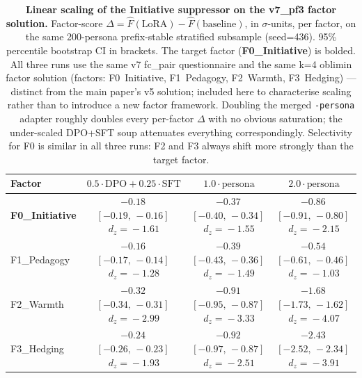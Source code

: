\begin{table}[h]
\centering
\small
\begin{tabular}{lccc}
\toprule
Factor & $0.5\!\cdot\!\mathrm{DPO} + 0.25\!\cdot\!\mathrm{SFT}$ & $1.0\!\cdot\!\mathrm{persona}$ & $2.0\!\cdot\!\mathrm{persona}$ \\
\midrule
\textbf{F0\_Initiative} & \textbf{$-0.18$\,$[-0.19,\,-0.16]$\,$d_z\!=\!-1.61$} & \textbf{$-0.37$\,$[-0.40,\,-0.34]$\,$d_z\!=\!-1.55$} & \textbf{$-0.86$\,$[-0.91,\,-0.80]$\,$d_z\!=\!-2.15$} \\
F1\_Pedagogy & $-0.16$\,$[-0.17,\,-0.14]$\,$d_z\!=\!-1.28$ & $-0.39$\,$[-0.43,\,-0.36]$\,$d_z\!=\!-1.49$ & $-0.54$\,$[-0.61,\,-0.46]$\,$d_z\!=\!-1.03$ \\
F2\_Warmth & $-0.32$\,$[-0.34,\,-0.31]$\,$d_z\!=\!-2.99$ & $-0.91$\,$[-0.95,\,-0.87]$\,$d_z\!=\!-3.33$ & $-1.68$\,$[-1.73,\,-1.62]$\,$d_z\!=\!-4.07$ \\
F3\_Hedging & $-0.24$\,$[-0.26,\,-0.23]$\,$d_z\!=\!-1.93$ & $-0.92$\,$[-0.97,\,-0.87]$\,$d_z\!=\!-2.51$ & $-2.43$\,$[-2.52,\,-2.34]$\,$d_z\!=\!-3.91$ \\
\bottomrule
\end{tabular}
\caption{
\textbf{Linear scaling of the Initiative suppressor on the v7\_pf3 factor solution.}
Factor-score $\Delta = \hat{F}(\text{LoRA}) - \hat{F}(\text{baseline})$, in $\sigma$-units, per factor, on the same 200-persona prefix-stable stratified subsample (seed=436).
95\% percentile bootstrap CI in brackets. The target factor (\textbf{F0\_Initiative}) is bolded.
All three runs use the same v7 fc\_pair questionnaire and the same k=4 oblimin factor solution (factors: F0~Initiative, F1~Pedagogy, F2~Warmth, F3~Hedging) — distinct from the main paper's v5 solution; included here to characterise scaling rather than to introduce a new factor framework.
Doubling the merged \texttt{-persona} adapter roughly doubles every per-factor $\Delta$ with no obvious saturation; the under-scaled DPO+SFT soup attenuates everything correspondingly. Selectivity for F0 is similar in all three runs: F2 and F3 always shift more strongly than the target factor.
}
\label{tab:initiative-sup-scaling}
\end{table}
